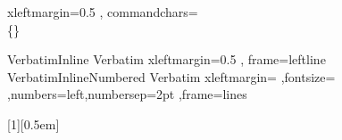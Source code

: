
\newcommand{\jfdm}[1]{\chcomment[id=jfdm]{#1}}
\newcommand{\gallais}[1]{\chcomment[id=gallais]{#1}}

\newcommand{\Velo}{V{\'e}lo\xspace}
\newcommand{\Idris}{Idris~2}
\newcommand{\DeBruijn}{De~Bruijn}

\fvset
{ xleftmargin=0.5\parindent
, commandchars=\\\{\}
}

\DefineVerbatimEnvironment%
  {VerbatimInline}
  {Verbatim}
  {xleftmargin=0.5\parindent
  , frame=leftline
  }
\DefineVerbatimEnvironment%
  {VerbatimInlineNumbered}
  {Verbatim}
  {xleftmargin=\parindent
    ,fontsize=\smaller
    ,numbers=left,numbersep=2pt
    ,frame=lines
  }

[1][0.5em]
{\vspace{#1}
 {\centering\BODY}
 \vspace{#1}
}
